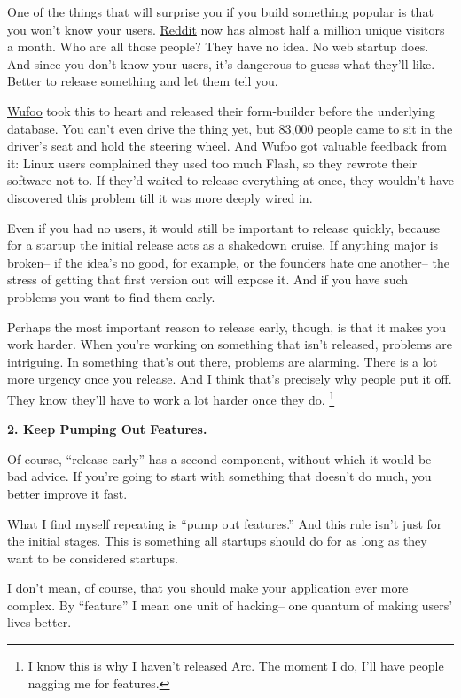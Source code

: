 \documentclass[12pt]{book}
\begin{document}
One of the things that will surprise you if you build something popular
is that you won't know your users. \href{http://reddit.com}{Reddit} now
has almost half a million unique visitors a month. Who are all those
people? They have no idea. No web startup does. And since you don't know
your users, it's dangerous to guess what they'll like. Better to release
something and let them tell you.

\href{http://wufoo.com}{Wufoo} took this to heart and released their
form-builder before the underlying database. You can't even drive the
thing yet, but 83,000 people came to sit in the driver's seat and hold
the steering wheel. And Wufoo got valuable feedback from it: Linux users
complained they used too much Flash, so they rewrote their software not
to. If they'd waited to release everything at once, they wouldn't have
discovered this problem till it was more deeply wired in.

Even if you had no users, it would still be important to release
quickly, because for a startup the initial release acts as a shakedown
cruise. If anything major is broken-- if the idea's no good, for
example, or the founders hate one another-- the stress of getting that
first version out will expose it. And if you have such problems you want
to find them early.

Perhaps the most important reason to release early, though, is that it
makes you work harder. When you're working on something that isn't
released, problems are intriguing. In something that's out there,
problems are alarming. There is a lot more urgency once you release. And
I think that's precisely why people put it off. They know they'll have
to work a lot harder once they do. \footnote{I know this is why I haven't released Arc. The moment I do, I'll
have people nagging me for features.}

\textbf{2. Keep Pumping Out Features.}

Of course, ``release early'' has a second component, without which it
would be bad advice. If you're going to start with something that
doesn't do much, you better improve it fast.

What I find myself repeating is ``pump out features.'' And this rule
isn't just for the initial stages. This is something all startups should
do for as long as they want to be considered startups.

I don't mean, of course, that you should make your application ever more
complex. By ``feature'' I mean one unit of hacking-- one quantum of
making users' lives better.
\end{document}
